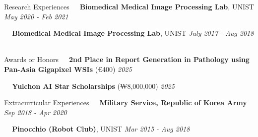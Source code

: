 \documentclass{resume} %
\begin{document}
\begin{rSection}{Research Experiences}
\textbullet~\,\, 
{\bf Biomedical Medical Image Processing Lab}{, UNIST} \hfill {\it May 2020 - Feb 2021}
\\ \hspace*{1.5em}{Researcher (Advisor: Prof. Se Young Chun)} 

\textbullet~\,\, 
{\bf Biomedical Medical Image Processing Lab}{, UNIST}  \hfill {\it July 2017 - Aug 2018}
\\ \hspace*{1.5em}{Student Intership (Advisor: Prof. Se Young Chun)} \\
\end{rSection}




\begin{rSection}{Awards or Honors}
\textbullet~\,\, 
{\bf 2nd Place in Report Generation in Pathology using Pan-Asia Gigapixel WSIs} (€400) \hfill {\it 2025}
\\ \hspace*{1.5em}{Challenge by International Conference on MICCAI (26 Teams participated)}
\end{rSection}


\textbullet~\,\, 
{\bf Yulchon AI Star Scholarships} (₩8,000,000) \hfill {\it 2025}
\\ \hspace*{1.5em}{Youlchon Foundation \& SNU AI Institute}




\begin{rSection}{Extracurricular Experiences}
\textbullet~\,\, 
{\bf Military Service, Republic of Korea Army} \hfill {\it Sep 2018 - Apr 2020}
\\ \hspace*{1.5em}{Discharged as Sergeant}

\textbullet~\,\, 
{\bf Pinocchio (Robot Club)}{, UNIST} \hfill {\it Mar 2015 - Aug 2018}
\\ \hspace*{1.5em}{Education Director} 
\end{rSection}
\end{document}
